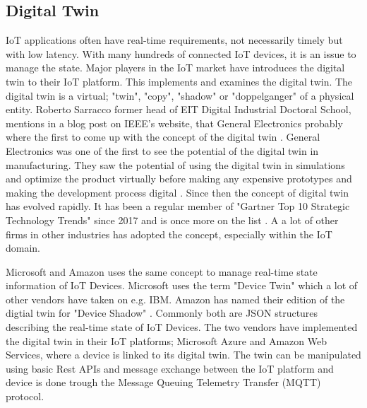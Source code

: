 \subsection{Digital Twin}
IoT applications often have real-time requirements, not necessarily timely but with low latency. With many hundreds of connected IoT devices, it is an issue to manage the state. Major players in the IoT market have introduces the digital twin to their IoT platform. This implements and examines the digital twin. The digital twin is a virtual; "twin", "copy", "shadow" or "doppelganger" of a physical entity. Roberto Sarracco former head of EIT Digital Industrial Doctoral School, mentions in a blog post on IEEE's website, that General Electronics probably where the first to come up with the concept of the digital twin \cite{IEEE}.
General Electronics was one of the first to see the potential of the digital twin in manufacturing. They saw the potential of using the digital twin in simulations and optimize the product virtually before making any expensive prototypes and making the development process digital \cite{GE}. Since then the concept of digital twin has evolved rapidly. It has been a regular member of "Gartner Top 10 Strategic Technology Trends" since 2017 and is once more on the list \cite{Gartner}. A a lot of other firms in other industries has adopted the concept, especially within the IoT domain. 

Microsoft and Amazon uses the same concept to manage real-time state information of IoT Devices. Microsoft uses the term "Device Twin" \cite{MS} which a lot of other vendors have taken on e.g. IBM. Amazon has named their edition of the digtial twin for "Device Shadow" \cite{Amazon}. Commonly both are JSON structures describing the real-time state of IoT Devices. The two vendors have implemented the digital twin in their IoT platforms; Microsoft Azure and Amazon Web Services, where a device is linked to its digital twin. The twin can be manipulated using basic Rest APIs and message exchange between the IoT platform and device is done trough the Message Queuing Telemetry Transfer (MQTT) protocol. 